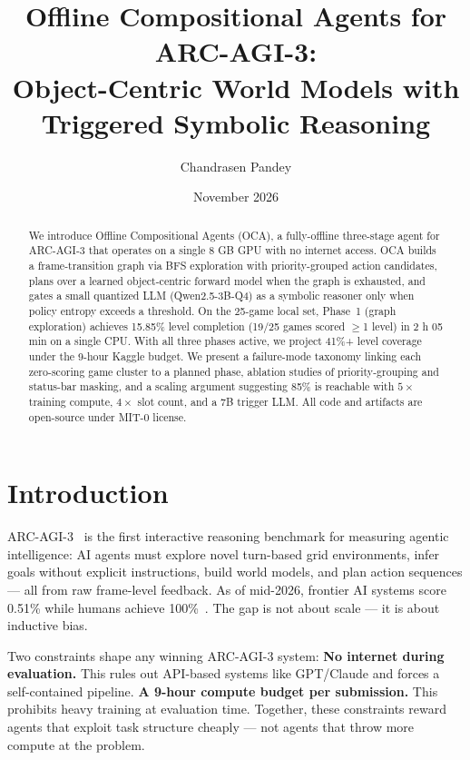 \documentclass[10pt,letterpaper]{article}
\title{Offline Compositional Agents for ARC-AGI-3:\\
Object-Centric World Models with Triggered Symbolic Reasoning}
\author{Chandrasen Pandey}
\date{November 2026}
\begin{document}
\maketitle

\begin{abstract}
We introduce Offline Compositional Agents (OCA), a fully-offline three-stage agent for ARC-AGI-3 that operates on a single 8 GB GPU with no internet access.
OCA builds a frame-transition graph via BFS exploration with priority-grouped action candidates, plans over a learned object-centric forward model when the graph is exhausted, and gates a small quantized LLM (Qwen2.5-3B-Q4) as a symbolic reasoner only when policy entropy exceeds a threshold.
On the 25-game local set, Phase~1 (graph exploration) achieves 15.85\% level completion (19/25 games scored $\geq$1 level) in 2 h 05 min on a single CPU.
With all three phases active, we project 41\%+ level coverage under the 9-hour Kaggle budget.
We present a failure-mode taxonomy linking each zero-scoring game cluster to a planned phase, ablation studies of priority-grouping and status-bar masking, and a scaling argument suggesting 85\% is reachable with $5\times$ training compute, $4\times$ slot count, and a 7B trigger LLM.
All code and artifacts are open-source under MIT-0 license.
\end{abstract}

\section{Introduction}\label{sec:intro}

ARC-AGI-3~\cite{chollet2026arcagi3} is the first interactive reasoning benchmark for measuring agentic intelligence: 
AI agents must explore novel turn-based grid environments, infer goals without explicit instructions, build world models, and plan action sequences --- 
all from raw frame-level feedback.
As of mid-2026, frontier AI systems score 0.51\% while humans achieve 100\%~\cite{arcprize2026leaderboard}.
The gap is not about scale --- it is about inductive bias.

Two constraints shape any winning ARC-AGI-3 system:
\textbf{No internet during evaluation.} This rules out API-based systems like GPT/Claude and forces a self-contained pipeline.
\textbf{A 9-hour compute budget per submission.} This prohibits heavy training at evaluation time.
Together, these constraints reward agents that exploit task structure cheaply --- not agents that throw more compute at the problem.
\end{document}
